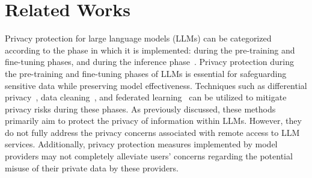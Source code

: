 \section{Related Works}
\label{sec:rel}

Privacy protection for large language models (LLMs) can be categorized according to the phase in which it is implemented: during the pre-training and fine-tuning phases, and during the inference phase~\citep{yan2024protecting}.
Privacy protection during the pre-training and fine-tuning phases of LLMs is essential for safeguarding sensitive data while preserving model effectiveness. 
Techniques such as differential privacy~\citep{li2021large,wu2022adaptive,xu2024fwdllm}, data cleaning~\citep{bai2022training,kandpal2022deduplicating}, and federated learning~\citep{yu2023federated,xu2024fwdllm,zhang2024towards} can be utilized to mitigate privacy risks during these phases.
As previously discussed, these methods primarily aim to protect the privacy of information within LLMs. However, they do not fully address the privacy concerns associated with remote access to LLM services. 
Additionally, privacy protection measures implemented by model providers may not completely alleviate users' concerns regarding the potential misuse of their private data by these providers.


